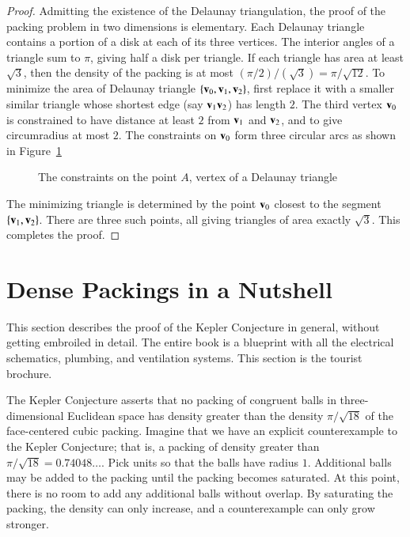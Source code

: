 \begin{proof}
  Admitting the existence of the Delaunay triangulation, the proof of
  the packing problem in two dimensions is elementary.  Each Delaunay
  triangle contains a portion of a disk at each of its three vertices.
  The interior angles of a triangle sum to $\pi$, giving half a disk
  per triangle.  If each triangle has area at least $\sqrt{3}$, then
  the density of the packing is at most $(\pi/2)/(\sqrt{3}) =
  \pi/\sqrt{12}$.  To minimize the area of Delaunay triangle
  $\{{\mathbf v}_0,{\mathbf v}_1,{\mathbf v}_2\}$, first replace it with a smaller similar triangle
  whose shortest edge (say ${\mathbf v}_1{\mathbf v}_2$) has length $2$.  The third vertex
  ${\mathbf v}_0$ is constrained to have distance at least $2$ from ${\mathbf v}_1$ and
  ${\mathbf v}_2$, and to give circumradius at most $2$.  The constraints on
  ${\mathbf v}_0$ form three circular arcs as shown in
  Figure~\ref{fig:2D-FT} %

\begin{figure}[htb]
  \centering
  \caption{The constraints on the point $A$, vertex of a Delaunay triangle}
  \label{fig:2D-FT}
\end{figure}

The minimizing triangle is determined by the point ${\mathbf v}_0$ closest to
the segment $\{{\mathbf v}_1,{\mathbf v}_2\}$.  There are three such points, all giving
triangles of area exactly $\sqrt3$.  This completes the proof.
\end{proof}

\section{Dense Packings in a Nutshell}

This section describes the proof of the Kepler Conjecture in general,
without
getting embroiled in detail.  The entire book
is a blueprint with all the electrical schematics, plumbing, and
ventilation systems.  This section is the tourist brochure.

The Kepler Conjecture asserts that no packing of congruent balls in
three-dimensional Euclidean space has density greater than the density
$\pi/\sqrt{18}$ of the face-centered cubic packing.  Imagine that we
have an explicit counterexample to the Kepler Conjecture; that is, a
packing of density greater than $\pi/\sqrt{18}= 0.74048\ldots$.  Pick
units so that the balls have radius $1$.  Additional balls may be
added to the packing until the packing becomes saturated.  At this
point, there is no room to add any additional balls without overlap.
By saturating the packing, the density can only increase, and a
counterexample can only grow stronger.

